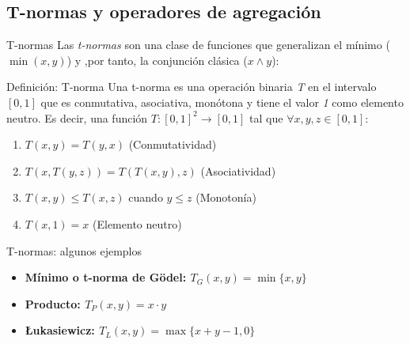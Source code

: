 \documentclass{beamer}
\begin{document}
\subsection{T-normas y operadores de agregación}
\begin{frame}{T-normas}
	  Las \emph{t-normas} son una clase de funciones que generalizan el mínimo ($\min(x,y)$) y ,por tanto, la conjunción clásica ($x\wedge y$):
      \begin{block}{Definición: T-norma}
		Una t-norma es una operación binaria \emph{T} en el intervalo $[0,1]$ que es conmutativa, asociativa, monótona y tiene el valor \emph{1} como elemento neutro. Es decir, una función $T : [0,1]^2 \rightarrow [0,1]$ tal que $\forall x,y,z \in [0,1]$:
		\begin{enumerate}
		   \item $T(x,y) = T(y,x)$ (Conmutatividad)
		   \item $T(x,T(y,z)) = T(T(x,y),z)$ (Asociatividad)
		   \item $T(x,y) \leq T(x,z)$ cuando $y \leq z$ (Monotonía)
		   \item $T(x,1) = x$ (Elemento neutro)
		  \end{enumerate}
      \end{block}
\end{frame}

\begin{frame}{T-normas: algunos ejemplos}
	\begin{itemize}
		\item \bfseries Mínimo o t-norma de Gödel: $T_{G}(x,y) = \min\{x,y\}$
		\item \bfseries Producto: $T_{P}(x,y) = x \cdot y$
		\item \bfseries \L{}ukasiewicz: $T_{L}(x,y) = \max\{x+y-1,0\}$
	\end{itemize}
	\vspace{0.2cm}
	\newlength\figureheight
    \newlength\figurewidth 
	\setlength\figureheight{2cm}
	\setlength\figurewidth{3cm}
	
	\setlength\figureheight{2cm}
	\setlength\figurewidth{3cm}
	
	\centering
	\setlength\figureheight{2cm}
	\setlength\figurewidth{3cm}
	
\end{frame}
\end{document}
